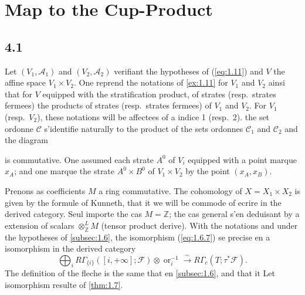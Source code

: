 \documentclass[11pt,a4paper]{article}
\theoremstyle{plain}
\theoremstyle{definition}
\newcommand{\ori}{\operatorname{or}}
\begin{document}
\section{Map to the Cup-Product}\label{sec:4}

\subsection{4.1}\label{subsec:4.1}

Let $(V_1,\mathcal{A}_1)$ and $(V_2,\mathcal{A}_2)$ verifiant the hypotheses of (\ref{eq:1.11}) and $V$ the affine space $V_1 \times V_2$. One reprend the notations of \ref{ex:1.11} for $V_1$ and $V_2$ ainsi that for $V$ equipped with the stratification product, of strates (resp.~strates fermees) the products of strates (resp.~strates fermees) of $V_1$ and $V_2$. For $V_1$ (resp.~$V_2$), these notations will be affectees of a indice 1 (resp.~2). the set ordonne $\mathcal{C}$ s'identifie naturally to the product of the sets ordonnes $\mathcal{C}_1$ and $\mathcal{C}_2$ and the diagram
is commutative. One assumed each strate $A^0$ of $V_i$ equipped with a point marque $x_A$; and one marque the strate $A^0 \times B^0$ of $V_1 \times V_2$ by the point $(x_A, x_B)$.

Prenons as coefficients $M$ a ring commutative. The cohomology of $X = X_1 \times X_2$ is given by the formule of Kunneth, that it we will be commode of ecrire in the derived category. Seul importe the cas $M = \mathbb{Z}$; the cas general s'en deduisant by a extension of scalars $\otimes^L_{\mathbb{Z}} M$ (tensor product derive). With the notations and under the hypotheses of \ref{subsec:1.6}, the isomorphism (\ref{eq:1.6.7}) se precise en a isomorphism in the derived category
\begin{equation}\label{eq:4.1.1}
\bigoplus_i R\Gamma_{\{i\}}([i,+\infty];\mathcal{F}) \otimes \ori_i^{-1} \xrightarrow{\sim} R\Gamma_c(T;\tau^*\mathcal{F}).
\tag{4.1.1}
\end{equation}
The definition of the fleche is the same that en \ref{subsec:1.6}, and that it Let isomorphism resulte of \ref{thm:1.7}.
\end{document}
